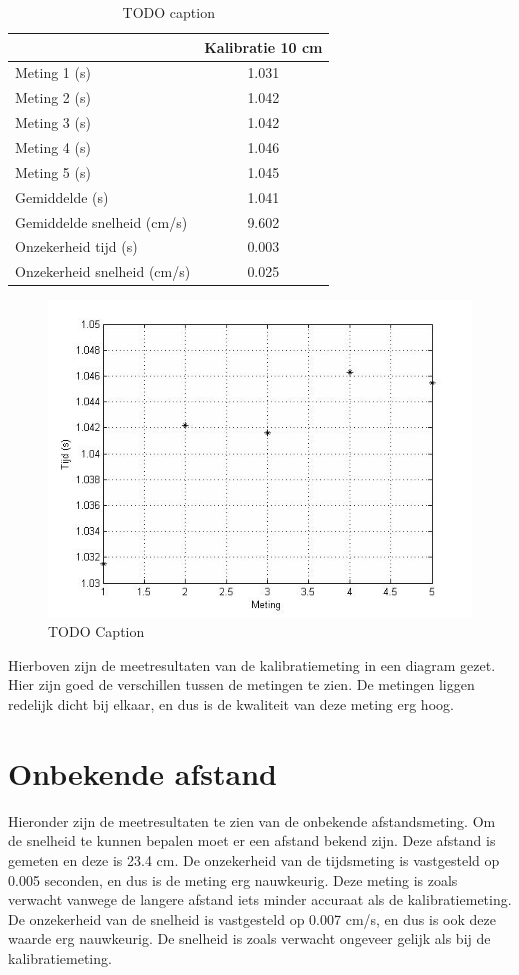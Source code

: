 \documentclass{report}
\begin{document}
\begin{table}
 \centering
\begin{tabular}{| l| c|}
\hline
    & Kalibratie 10 cm \\
\hline
   Meting 1 (s) & 1.031 \\
\hline
   Meting 2 (s) & 1.042 \\
\hline
   Meting 3 (s) & 1.042 \\
\hline
   Meting 4 (s) & 1.046 \\
\hline
   Meting 5 (s) & 1.045 \\
\hline
   Gemiddelde (s) & 1.041 \\
\hline
   Gemiddelde snelheid (cm/s) & 9.602 \\
\hline
   Onzekerheid tijd (s) & 0.003 \\
\hline
   Onzekerheid snelheid (cm/s) & 0.025 \\
\hline
\end{tabular}
\caption{TODO caption}
\end{table}
\begin{figure}[H]
 \centering
\includegraphics[width=150mm] {grafiekmeetresultaten.jpg}
\caption{TODO Caption}
\end{figure}
Hierboven zijn de meetresultaten van de kalibratiemeting in een diagram gezet. Hier zijn goed de verschillen tussen de metingen te zien. De metingen liggen redelijk dicht bij elkaar, en dus is de kwaliteit van deze meting erg hoog.
\section{Onbekende afstand}
Hieronder zijn de meetresultaten te zien van de onbekende afstandsmeting. Om de snelheid te kunnen bepalen moet er een afstand bekend zijn. Deze afstand is gemeten en deze is 23.4 cm. De onzekerheid van de tijdsmeting is vastgesteld op 0.005 seconden, en dus is de meting erg nauwkeurig. Deze meting is zoals verwacht vanwege de langere afstand iets minder accuraat als de kalibratiemeting. De onzekerheid van de snelheid is vastgesteld op 0.007 cm/s, en dus is ook deze waarde erg nauwkeurig. De snelheid is zoals verwacht ongeveer gelijk als bij de kalibratiemeting.
\end{document}
